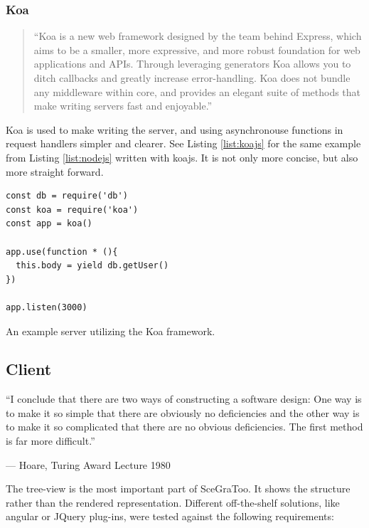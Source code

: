 \subsubsection{Koa}
\label{par:Koa}
\begin{quote}
  ``Koa is a new web framework designed by the team behind Express, which aims to be a smaller, more expressive, and more robust foundation for web applications and APIs. Through leveraging generators Koa allows you to ditch callbacks and greatly increase error-handling. Koa does not bundle any middleware within core, and provides an elegant suite of methods that make writing servers fast and enjoyable.'' \cite{koajs}
\end{quote}

Koa is used to make writing the server, and using asynchronouse functions in request handlers simpler and clearer.
See Listing \ref{list:koajs} for the same example from Listing \ref{list:nodejs} written with koajs.
It is not only more concise, but also more straight forward.

\begin{listing}
  \begin{verbatim}
const db = require('db')
const koa = require('koa')
const app = koa()

app.use(function * (){
  this.body = yield db.getUser()
})

app.listen(3000)
  \end{verbatim}
  \caption{An example server utilizing the Koa framework.}
  \label{list:koajs}
\end{listing}

\subsection{Client}
\label{client}


\epigraph{``I conclude that there are two ways of constructing a software design:
One way is to make it so simple that there are obviously no deficiencies
and the other way is to make it so complicated that there are no obvious
deficiencies. The first method is far more difficult.''}{--- Hoare, Turing Award Lecture 1980}

The tree-view is the most important part of SceGraToo. It shows the
structure rather than the rendered representation. Different
off-the-shelf solutions, like angular or JQuery plug-ins, were tested
against the following requirements:

